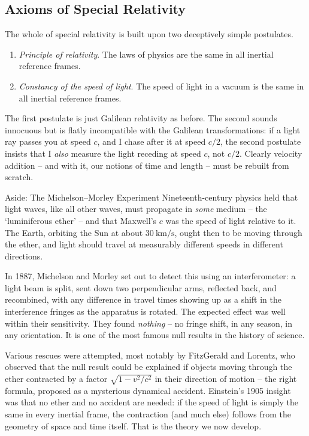\documentclass[a4paper]{scrartcl}
\begin{document}
\subsection{Axioms of Special Relativity}

The whole of special relativity is built upon two deceptively simple postulates.

\begin{axiom}
	\begin{enumerate}
		\item \emph{Principle of relativity}. The laws of physics are the same in all inertial reference frames.
		\item \emph{Constancy of the speed of light}. The speed of light in a vacuum is the same in all inertial reference frames.
	\end{enumerate}
\end{axiom}

The first postulate is just Galilean relativity as before. The second sounds innocuous but is flatly incompatible with the Galilean transformations: if a light ray passes you at speed $c$, and I chase after it at speed $c/2$, the second postulate insists that I \emph{also} measure the light receding at speed $c$, not $c/2$. Clearly velocity addition -- and with it, our notions of time and length -- must be rebuilt from scratch.

\begin{aside}{Aside: The Michelson--Morley Experiment}
	Nineteenth-century physics held that light waves, like all other waves, must propagate in \emph{some} medium -- the `luminiferous ether' -- and that Maxwell's $c$ was the speed of light relative to it. The Earth, orbiting the Sun at about $\SI{30}{\kilo\meter\per\second}$, ought then to be moving through the ether, and light should travel at measurably different speeds in different directions.

	In 1887, Michelson and Morley set out to detect this using an interferometer: a light beam is split, sent down two perpendicular arms, reflected back, and recombined, with any difference in travel times showing up as a shift in the interference fringes as the apparatus is rotated. The expected effect was well within their sensitivity. They found \emph{nothing} -- no fringe shift, in any season, in any orientation. It is one of the most famous null results in the history of science.

	Various rescues were attempted, most notably by FitzGerald and Lorentz, who observed that the null result could be explained if objects moving through the ether contracted by a factor $\sqrt{1 - v^2/c^2}$ in their direction of motion -- the right formula, proposed as a mysterious dynamical accident. Einstein's 1905 insight was that no ether and no accident are needed: if the speed of light is simply the same in every inertial frame, the contraction (and much else) follows from the geometry of space and time itself. That is the theory we now develop.

\end{aside}
\end{document}
